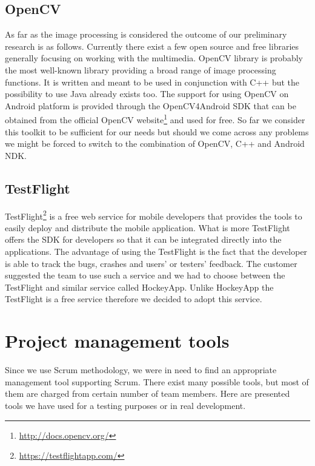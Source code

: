 
\subsection{OpenCV} \label{txt:image_processing_library}

As far as the image processing is considered the outcome of our preliminary research is as follows.
Currently there exist a few open source and free libraries generally focusing on working with the multimedia.
OpenCV library is probably the most well-known library providing a broad range of image processing functions.
It is written and meant to be used in conjunction with C++ but the possibility to use Java already exists too.
The support for using OpenCV on Android platform is provided through the OpenCV4Android SDK that can be obtained from the official OpenCV website\footnote{\url{http://docs.opencv.org/}} and used for free.
So far we consider this toolkit to be sufficient for our needs but should we come across any problems we might be forced to switch to the combination of OpenCV, C++ and Android NDK.


\subsection{TestFlight}

TestFlight\footnote{\url{https://testflightapp.com/}} is a free web service for mobile developers that provides the tools to easily deploy and distribute the mobile application. What is more TestFlight offers the SDK for developers so that it can be integrated directly into the applications. The advantage of using the TestFlight is the fact that the developer is able to track the bugs, crashes and users' or testers' feedback. The customer suggested the team to use such a service and we had to choose between the TestFlight and similar service called HockeyApp. Unlike HockeyApp the TestFlight is a free service therefore we decided to adopt this service.


\section{Project management tools}
Since we use Scrum methodology, we were in need to find an appropriate management tool supporting Scrum. 
There exist many possible tools, but most of them are charged from
certain number of team members. 
Here are presented tools we have used for a testing purposes or in real development.

